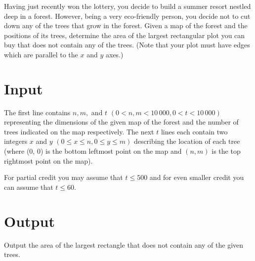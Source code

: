 Having just recently won the lottery, you decide to build a summer resort nestled deep in a forest.
However, being a very eco-friendly person, you decide not to cut down any of the trees that grow in
the forest. Given a map of the forest and the positions of its trees, determine the area of the
largest rectangular plot you can buy that does not contain any of the trees. (Note that your plot
must have edges which are parallel to the $x$ and $y$ axes.)

\section*{Input}
The first line contains $n, m,$ and $t$ $(0 < n, m < 10\,000, 0 < t < 10\,000)$ representing the
dimensions of the given map of the forest and the number of trees indicated on the map respectively.
The next $t$ lines each contain two integers $x$ and $y$ $(0 \le x \le n, 0 \le y \le m)$ describing the
location of each tree (where (0, 0) is the bottom leftmost point on the map and $(n, m)$ is the top
rightmost point on the map).

For partial credit you may assume that $t \le 500$ and for even smaller credit you can assume that
$t \le 60$.

\section*{Output}
Output the area of the largest rectangle that does not contain any of the given trees.
